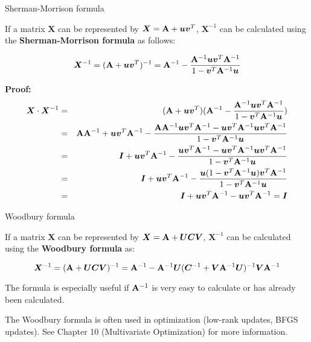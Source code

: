 \documentclass[11pt,compress,t,notes=noshow, xcolor=table]{beamer}
\begin{document}
\begin{vbframe}{Sherman-Morrison formula}

If a matrix $\bm{X}$ can be represented by $\bm{X} = \mathbf{A} + \bm{u}\bm{v}^T$, $\bm{X}^{-1}$ can be calculated using the \textbf{Sherman-Morrison formula} as follows:

$$\bm{X}^{-1} = (\mathbf{A} + \bm{u}\bm{v}^T)^{-1} = \mathbf{A}^{-1} -  \frac{\mathbf{A}^{-1}\bm{u}\bm{v}^T\mathbf{A}^{-1}}{1-\bm{v}^T\mathbf{A}^{-1}\bm{u}}$$

\textbf{Proof:}
\vspace*{-.5cm}
\begin{eqnarray*}
\bm{X} \cdot \bm{X}^{-1} &=& (\mathbf{A} + \bm{u}\bm{v}^T) (\mathbf{A}^{-1} -  \frac{\mathbf{A}^{-1}\bm{u}\bm{v}^T\mathbf{A}^{-1}}{1-\bm{v}^T\mathbf{A}^{-1}\bm{u}}) \\ &=& \mathbf{A}\mathbf{A}^{-1} + \bm{u}\bm{v}^T \mathbf{A}^{-1} - \frac{\mathbf{A}\mathbf{A}^{-1}\bm{u}\bm{v}^T\mathbf{A}^{-1} - \bm{u}\bm{v}^T\mathbf{A}^{-1}\bm{u}\bm{v}^T\mathbf{A}^{-1}}{1-\bm{v}^T\mathbf{A}^{-1}\bm{u}}   \\
&=& \bm{I} + \bm{u}\bm{v}^T \mathbf{A}^{-1} - \frac{\bm{u}\bm{v}^T\mathbf{A}^{-1} - \bm{u}\bm{v}^T\mathbf{A}^{-1}\bm{u}\bm{v}^T\mathbf{A}^{-1}}{1-\bm{v}^T\mathbf{A}^{-1}\bm{u}}  \\ &=&  \bm{I} + \bm{u}\bm{v}^T \mathbf{A}^{-1} - \frac{\bm{u} (1 - \bm{v}^T\mathbf{A}^{-1}\bm{u}) \bm{v}^T\mathbf{A}^{-1}}{1-\bm{v}^T\mathbf{A}^{-1}\bm{u}}\\ &=& \bm{I} + \bm{u}\bm{v}^T\mathbf{A}^{-1} - \bm{u}\bm{v}^T\mathbf{A}^{-1} = \bm{I}
\end{eqnarray*}

\end{vbframe}

\begin{vbframe}{Woodbury formula}

If a matrix $\bm{X}$ can be represented by $\bm{X} = \mathbf{A} + \bm{U}\bm{C}\bm{V}$, $\bm{X}^{-1}$ can be calculated using the \textbf{Woodbury formula} as:

$$\bm{X}^{-1} = (\mathbf{A} + \bm{U}\bm{C}\bm{V})^{-1} = \mathbf{A}^{-1} - \mathbf{A}^{-1}\bm{U}(\bm{C}^{-1} + \bm{V}\mathbf{A}^{-1}\bm{U})^{-1}\bm{V}\mathbf{A}^{-1}$$

The formula is especially useful if $\mathbf{A}^{-1}$ is very easy to calculate or has already been calculated.

\lz

The Woodbury formula is often used in optimization (low-rank updates, BFGS updates). See Chapter 10 (Multivariate Optimization) for more information.


\end{vbframe}

\endlecture
\end{document}
